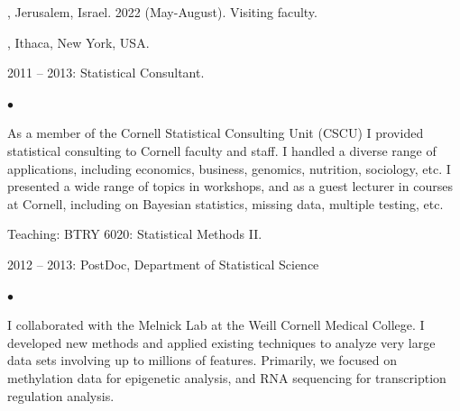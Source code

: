 \documentclass[12pt,a4paper]{article}
\newenvironment{list1}{
  \begin{list}{\ding{113}}{%
      \setlength{\itemsep}{0in}
      \setlength{\parsep}{0in} \setlength{\parskip}{0in}
      \setlength{\topsep}{0in} \setlength{\partopsep}{0in}
      \setlength{\leftmargin}{0.17in}}}{\end{list}}
\newenvironment{list2}{
  \begin{list}{$\bullet$}{%
      \setlength{\itemsep}{0in}
      \setlength{\parsep}{0in} \setlength{\parskip}{0in}
      \setlength{\topsep}{0in} \setlength{\partopsep}{0in}
      \setlength{\leftmargin}{0.2in}}}{\end{list}}
\begin{document}
, Jerusalem, Israel.
2022 (May-August). Visiting faculty.


, Ithaca, New York, USA.
\begin{list1}
\item[]  2011 -- 2013:  Statistical Consultant.
\begin{list2}
\item[] As a member of the Cornell Statistical Consulting Unit (CSCU) I provided
statistical consulting to Cornell faculty and staff.  I handled a diverse range
of applications, including economics, business, genomics, nutrition, sociology,
etc. I presented a wide range of topics in workshops, and as a guest lecturer in
courses at Cornell, including on Bayesian statistics, missing data, multiple
testing, etc.
\item[] Teaching: BTRY 6020: Statistical Methods II.
\end{list2}
\item[] 2012 -- 2013: PostDoc, Department of Statistical Science
\begin{list2}
\item[] I collaborated with the Melnick Lab at the Weill Cornell Medical College.
I developed new methods and applied existing
techniques to analyze very large data sets involving up to millions of
features.  Primarily, we focused on methylation data for epigenetic
analysis, and RNA sequencing for transcription regulation analysis.
\end{list2}
\end{list1}
\end{document}
